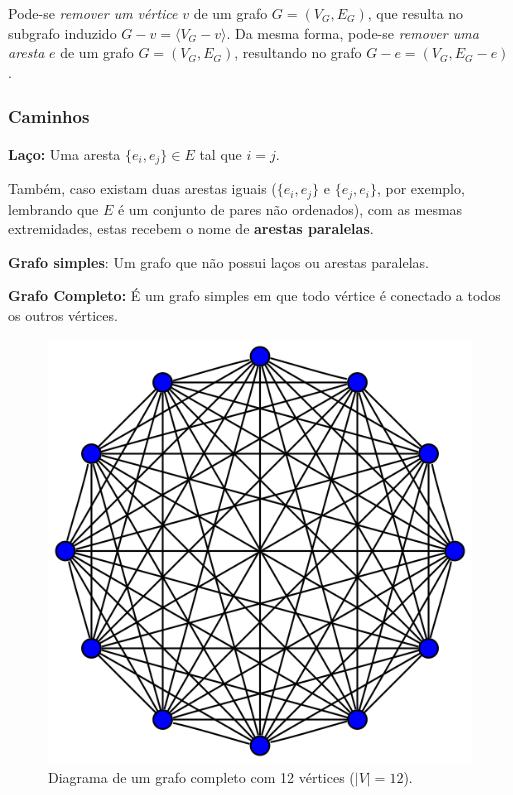 \documentclass[a4paper,12pt]{article}
\begin{document}
Pode-se \textit{remover um vértice} $v$ de um grafo $G = (V_G, E_G)$, que resulta no subgrafo induzido $G - v = \langle V_G- v\rangle$. Da mesma forma, pode-se \textit{remover uma aresta} $e$ de um grafo $G = (V_G, E_G)$, resultando no grafo $G-e = (V_G, E_G - e)$.

\subsubsection*{Caminhos}

 
\begin{center}
	\begin{minipage}{0.9 \linewidth}
		\textbf{Laço:} Uma aresta $\{e_i, e_j\} \in E$ tal que $i = j$.
	\end{minipage}
\end{center}

Também, caso existam duas arestas iguais ($\{e_i, e_j\}$ e 
$\{e_j, e_i\}$, por exemplo, lembrando que $E$ é um conjunto de pares não ordenados), com as mesmas extremidades, estas recebem o nome de \textbf{arestas paralelas}.

\begin{center}
	\begin{minipage}{0.9 \linewidth}
		\textbf{Grafo simples}: Um grafo que não possui laços ou arestas paralelas.
	\end{minipage}
\end{center}

\begin{center}
	\begin{minipage}{0.9 \linewidth}
		\textbf{Grafo Completo:} É um grafo simples em que todo vértice é conectado a todos os outros vértices.
	\end{minipage}
\end{center}

\begin{figure}[H]
	\begin{center}
		\includegraphics[width=0.4\linewidth]{figures/grafocompleto.png}
	\end{center}
	\caption{Diagrama de um grafo completo com 12 vértices ($|V| = 12$).}
	\label{fig:grafocompleto}
\end{figure}
\end{document}
